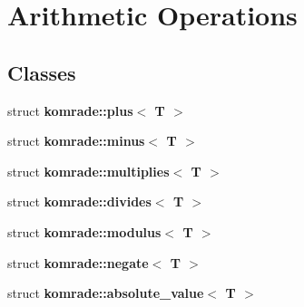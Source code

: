 \section{Arithmetic Operations}
\label{group__arithmetic__operations}
\subsection*{Classes}
\begin{CompactItemize}
\item 
struct {\bf komrade::plus$<$ T $>$}
\item 
struct {\bf komrade::minus$<$ T $>$}
\item 
struct {\bf komrade::multiplies$<$ T $>$}
\item 
struct {\bf komrade::divides$<$ T $>$}
\item 
struct {\bf komrade::modulus$<$ T $>$}
\item 
struct {\bf komrade::negate$<$ T $>$}
\item 
struct {\bf komrade::absolute\_\-value$<$ T $>$}
\end{CompactItemize}
